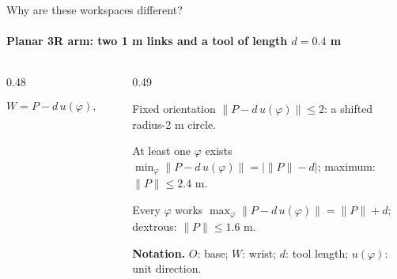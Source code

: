 \documentclass[aspectratio=169]{beamer}
\begin{document}
\begin{frame}[t]{Why are these workspaces different?}
    \framesubtitle{Planar 3R arm: two 1 m links and a tool of length $d=0.4$ m}
    \begin{columns}[T,onlytextwidth]
        \begin{column}{0.48\textwidth}
            \centering
            \[
                W=P-d\,u(\varphi),\qquad \|W\|\leq2.
            \]
        \end{column}
        \begin{column}{0.49\textwidth}
            \scriptsize
            \begin{block}{Fixed orientation}
                $\|P-d\,u(\varphi)\|\leq2$: a shifted radius-2 m circle.
            \end{block}
            \begin{block}{At least one $\varphi$ exists}
                $\min_\varphi\|P-d\,u(\varphi)\|=|\|P\|-d|$; maximum: $\|P\|\leq2.4$ m.
            \end{block}
            \begin{block}{Every $\varphi$ works}
                $\max_\varphi\|P-d\,u(\varphi)\|=\|P\|+d$; dextrous: $\|P\|\leq1.6$ m.
            \end{block}
            \textbf{Notation.} $O$: base; $W$: wrist; $d$: tool length; $u(\varphi)$: unit direction.
        \end{column}
    \end{columns}
\end{frame}
\end{document}
